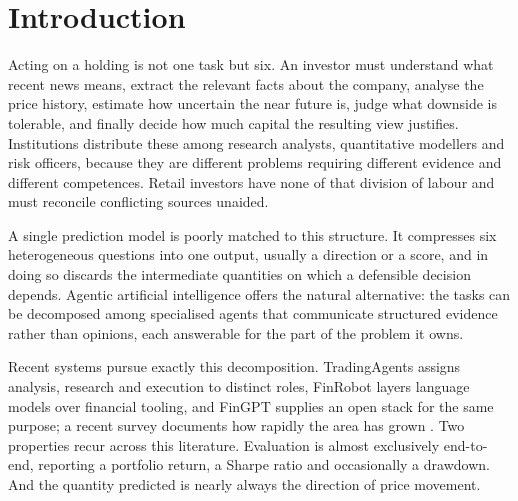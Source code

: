 \documentclass[pdflatex,sn-apa]{sn-jnl}%
\theoremstyle{thmstyleone}%
\theoremstyle{thmstyletwo}%
\theoremstyle{thmstylethree}%
\begin{document}


\maketitle

\section{Introduction}\label{sec:intro}

Acting on a holding is not one task but six. An investor must understand what
recent news means, extract the relevant facts about the company, analyse the
price history, estimate how uncertain the near future is, judge what downside
is tolerable, and finally decide how much capital the resulting view justifies.
Institutions distribute these among research analysts, quantitative modellers
and risk officers, because they are different problems requiring different
evidence and different competences. Retail investors have none of that division
of labour and must reconcile conflicting sources unaided.

A single prediction model is poorly matched to this structure. It compresses
six heterogeneous questions into one output, usually a direction or a score,
and in doing so discards the intermediate quantities on which a defensible
decision depends. Agentic artificial intelligence offers the natural
alternative: the tasks can be decomposed among specialised agents that
communicate structured evidence rather than opinions, each answerable for the
part of the problem it owns.

Recent systems pursue exactly this decomposition. TradingAgents
\citep{xiao2024tradingagents} assigns analysis, research and execution to
distinct roles, FinRobot \citep{yang2024finrobot} layers language models over
financial tooling, and FinGPT \citep{yang2023fingpt} supplies an open stack for
the same purpose; a recent survey documents how rapidly the area has grown
\citep{fu2025newquant}. Two properties recur across this literature. Evaluation
is almost exclusively end-to-end, reporting a portfolio return, a Sharpe ratio
and occasionally a drawdown. And the quantity predicted is nearly always the
direction of price movement.
\end{document}
